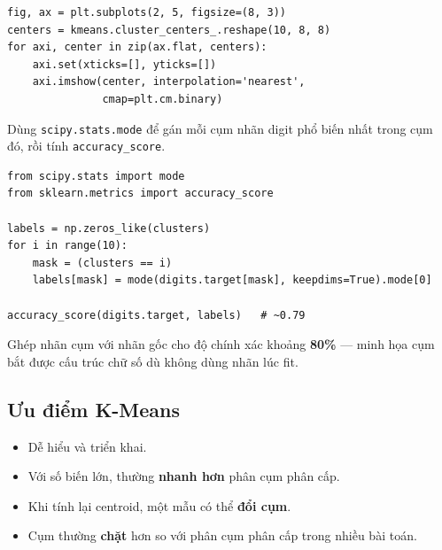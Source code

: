 \begin{vidu}[title={Vẽ tâm cụm dạng ảnh}]
\begin{lstlisting}
fig, ax = plt.subplots(2, 5, figsize=(8, 3))
centers = kmeans.cluster_centers_.reshape(10, 8, 8)
for axi, center in zip(ax.flat, centers):
    axi.set(xticks=[], yticks=[])
    axi.imshow(center, interpolation='nearest',
               cmap=plt.cm.binary)
\end{lstlisting}
\end{vidu}

\begin{ynghia}[title={Centroid mỗi cụm}]
\end{ynghia}

\begin{phuongphap}[title={Ghép nhãn cụm với nhãn thật}]
Dùng \texttt{scipy.stats.mode} để gán mỗi cụm nhãn digit phổ biến nhất trong cụm đó, rồi tính \texttt{accuracy\_score}.
\end{phuongphap}

\begin{vidu}[title={Gán nhãn và độ chính xác}]
\begin{lstlisting}
from scipy.stats import mode
from sklearn.metrics import accuracy_score

labels = np.zeros_like(clusters)
for i in range(10):
    mask = (clusters == i)
    labels[mask] = mode(digits.target[mask], keepdims=True).mode[0]

accuracy_score(digits.target, labels)   # ~0.79
\end{lstlisting}
\end{vidu}

\begin{tinhchat}[title={Độ chính xác ~80\%}]
Ghép nhãn cụm với nhãn gốc cho độ chính xác khoảng \textbf{80\%} --- minh họa cụm bắt được cấu trúc chữ số dù không dùng nhãn lúc fit.
\end{tinhchat}

\subsection{Ưu điểm K-Means}

\begin{tinhchat}[title={Danh sách ưu điểm}]
\begin{itemize}
  \item Dễ hiểu và triển khai.
  \item Với số biến lớn, thường \textbf{nhanh hơn} phân cụm phân cấp.
  \item Khi tính lại centroid, một mẫu có thể \textbf{đổi cụm}.
  \item Cụm thường \textbf{chặt} hơn so với phân cụm phân cấp trong nhiều bài toán.
\end{itemize}
\end{tinhchat}

